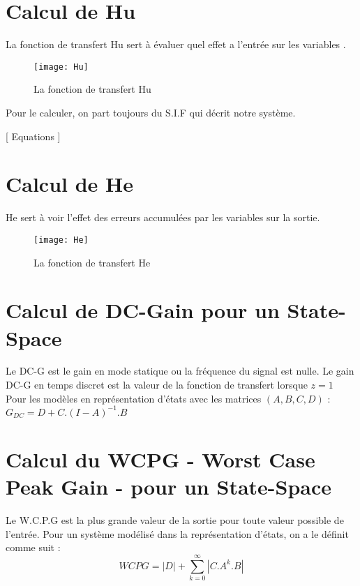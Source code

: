 \section{Calcul de Hu}
La fonction de transfert Hu sert à évaluer quel effet a l'entrée sur les variables .
\begin{figure}[h]
\centering
\texttt{[image: Hu]}
\caption{La fonction de transfert Hu}
\end{figure}

\bigskip
Pour le calculer, on part toujours du S.I.F qui décrit notre système.

[ Equations ]

\section{Calcul de He}
He sert à voir l'effet des erreurs accumulées par les variables sur la sortie.
\begin{figure}[h]
\centering
\texttt{[image: He]}
\caption{La fonction de transfert He}
\end{figure}

\section{Calcul de DC-Gain pour un State-Space}
Le DC-G est le gain en mode statique ou la fréquence du signal est nulle.
Le gain DC-G en temps discret est la valeur de la fonction de transfert lorsque $z=1$ \\
Pour les modèles en représentation d'états avec les matrices $(A, B, C, D)$ : \\
$G_{DC} = D + C.(I-A)^{-1}.B$

\section{Calcul du WCPG - Worst Case Peak Gain - pour un State-Space}
Le W.C.P.G est la plus grande valeur de la sortie pour toute valeur possible de l'entrée.
Pour un système modélisé dans la représentation d'états, on a le définit comme suit : \\ 
$$WCPG = |D|  + \sum_{k=0}^{\infty} |C.A^{k}.B|$$

